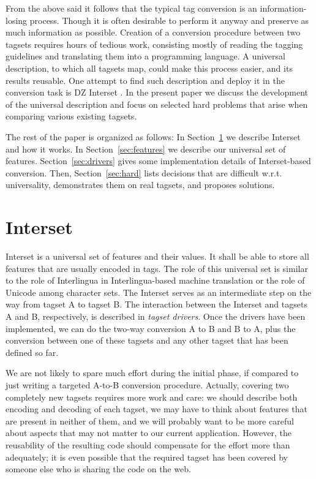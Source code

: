 \documentclass[11pt]{article}
\def\Sref#1{Section~\ref{#1}}
\begin{document}
From the above said it follows that the typical tag conversion is an information-losing process. Though it is often desirable to perform it anyway and preserve as much information as possible. Creation of a conversion procedure between two tagsets requires hours of tedious work, consisting mostly of reading the tagging guidelines and translating them into a programming language. A universal description, to which all tagsets map, could make this process easier, and its results reusable. One attempt to find such description and deploy it in the conversion task is DZ Interset \citep{biblio:ZeReusableTagset2008}. In the present paper we discuss the development of the universal description and focus on selected hard problems that arise when comparing various existing tagsets.

The rest of the paper is organized as follows: In \Sref{sec:interset} we describe Interset and how it works. In \Sref{sec:features} we describe our universal set of features. \Sref{sec:drivers} gives some implementation details of Interset-based conversion. Then, \Sref{sec:hard} lists decisions that are difficult w.r.t. universality, demonstrates them on real tagsets, and proposes solutions.

\section{Interset}
\label{sec:interset}

Interset is a universal set of features and their values. It shall be able to store all features that are usually encoded in tags. The role of this universal set is similar to the role of Interlingua in Interlingua-based machine translation \citep{interlingua} or the role of Unicode among character sets. The Interset serves as an intermediate step on the way from tagset A to tagset B. The interaction between the Interset and tagsets A and B, respectively, is described in \textit{tagset drivers}. Once the drivers have been implemented, we can do the two-way conversion A to B and B to A, plus the conversion between one of these tagsets and any other tagset that has been defined so far.

We are not likely to spare much effort during the initial phase, if compared to just writing a targeted A-to-B conversion procedure. Actually, covering two completely new tagsets requires more work and care: we should describe both encoding and decoding of each tagset, we may have to think about features that are present in neither of them, and we will probably want to be more careful about aspects that may not matter to our current application. However, the reusability of the resulting code should compensate for the effort more than adequately; it is even possible that the required tagset has been covered by someone else who is sharing the code on the web.
\end{document}
